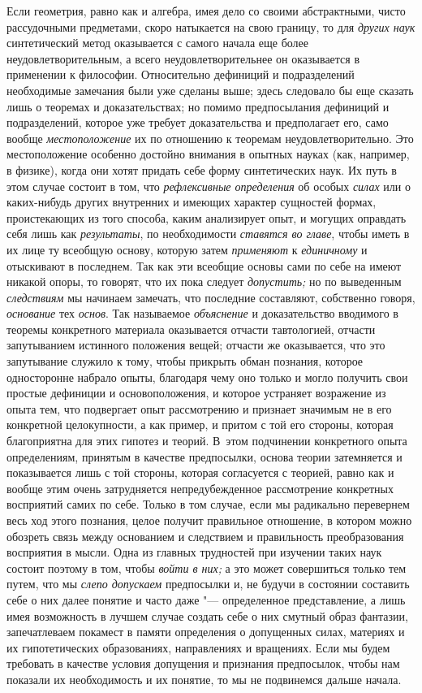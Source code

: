 Если геометрия, равно как и алгебра, имея дело со своими
абстрактными, чисто рассудочными предметами, скоро натыкается на свою
границу, то для {\em других наук}
синтетический метод оказывается с самого начала еще более
неудовлетворительным, а всего неудовлетворительнее он оказывается в
применении к философии. Относительно дефиниций и подразделений необходимые
замечания были уже сделаны выше; здесь следовало бы еще сказать лишь о
теоремах и доказательствах; но помимо предпосылания дефиниций и
подразделений, которое уже требует доказательства и предполагает его, само
вообще {\em местоположение}
их по отношению к теоремам неудовлетворительно. Это
местоположение особенно достойно внимания в опытных науках (как, например,
в физике), когда они хотят придать себе форму синтетических наук. Их путь в
этом случае состоит в том, что
{\em рефлексивные определения}
об особых {\em силах}
или о каких-нибудь других внутренних и имеющих характер
сущностей формах, проистекающих из того способа, каким анализирует опыт, и
могущих оправдать себя лишь как
{\em результаты}, по
необходимости {\em ставятся во главе},
чтобы иметь в их лице ту всеобщую основу, которую затем
{\em применяют} к
{\em единичному} и
отыскивают в последнем. Так как эти всеобщие основы сами по себе на имеют
никакой опоры, то говорят, что их пока следует
{\em допустить;} но по
выведенным {\em следствиям}
мы начинаем замечать, что последние составляют,
собственно говоря,
{\em основание} тех
{\em основ}. Так
называемое {\em объяснение}
и доказательство вводимого в теоремы конкретного материала
оказывается отчасти тавтологией, отчасти запутыванием истинного положения
вещей; отчасти же оказывается, что это запутывание служило к тому, чтобы
прикрыть обман познания, которое односторонне набрало опыты, благодаря чему
оно только и могло получить свои простые дефиниции и основоположения, и
которое устраняет возражение из опыта тем, что подвергает опыт рассмотрению
и признает значимым не в его конкретной целокупности, а как пример, и
притом с той его стороны, которая благоприятна для этих гипотез и теорий.
В~этом подчинении конкретного опыта определениям, принятым в качестве
предпосылки, основа теории затемняется и показывается лишь с той стороны,
которая согласуется с теорией, равно как и вообще этим очень затрудняется
непредубежденное рассмотрение конкретных восприятий самих по себе. Только в
том случае, если мы радикально перевернем весь ход этого познания, целое
получит правильное отношение, в котором можно обозреть связь между
основанием и следствием и правильность преобразования восприятия в мысли.
Одна из главных трудностей при изучении таких наук состоит поэтому в том,
чтобы {\em войти в них;}
а это может совершиться только тем путем, что мы
{\em слепо допускаем}
предпосылки и, не будучи в состоянии составить себе о них
далее понятие и часто даже "--- определенное представление, а
лишь имея возможность в лучшем случае создать себе о них смутный образ
фантазии, запечатлеваем покамест в памяти определения о допущенных силах,
материях и их гипотетических образованиях, направлениях и вращениях. Если
мы будем требовать в качестве условия допущения и признания предпосылок,
чтобы нам показали их необходимость и их понятие, то мы не подвинемся
дальше начала.

